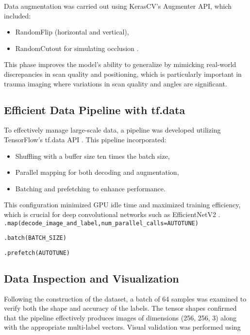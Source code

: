 \documentclass[a4paper,12pt]{article}
\begin{document}
Data augmentation was carried out using KerasCV’s Augmenter API, which included:
\begin{itemize}
    \item RandomFlip (horizontal and vertical),
    \item RandomCutout for simulating occlusion \cite{kerascv2024augmentation}.

\end{itemize}
This phase improves the model's ability to generalize by mimicking real-world discrepancies in scan quality and positioning, which is particularly important in trauma imaging where variations in scan quality and angles are significant.

\subsection{Efficient Data Pipeline with tf.data}
To effectively manage large-scale data, a pipeline was developed utilizing TensorFlow’s tf.data API \cite{tensorflow2024tfdata}. This pipeline incorporated:

\begin{itemize}

    \item Shuffling with a buffer size ten times the batch size,
    \item Parallel mapping for both decoding and augmentation,
    \item Batching and prefetching to enhance performance.

\end{itemize}
This configuration minimized GPU idle time and maximized training efficiency, which is crucial for deep convolutional networks such as EfficientNetV2 \cite{tan2021efficientnetv2}. \\

\verb|.map(decode_image_and_label,num_parallel_calls=AUTOTUNE)|

\verb|.batch(BATCH_SIZE)|

\verb|.prefetch(AUTOTUNE)|

\subsection{Data Inspection and Visualization}
Following the construction of the dataset, a batch of 64 samples was examined to verify both the shape and accuracy of the labels. The tensor shapes confirmed that the pipeline effectively produces images of dimensions (256, 256, 3) along with the appropriate multi-label vectors. Visual validation was performed using
\end{document}
